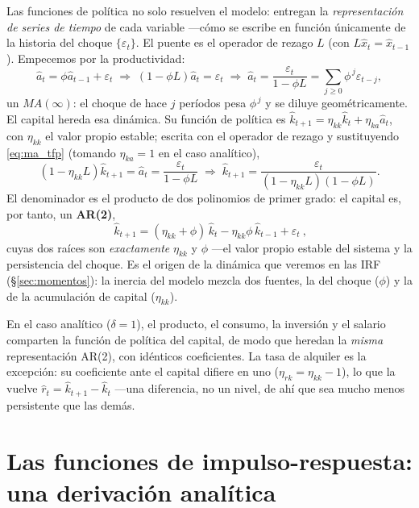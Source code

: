 \documentclass[11pt,a4paper]{report}
\begin{document}
Las funciones de política no solo resuelven el modelo: entregan la
\emph{representación de series de tiempo} de cada variable ---cómo se escribe en
función únicamente de la historia del choque $\{\varepsilon_t\}$. El puente es el
operador de rezago $L$ (con $L\hat{x}_t=\hat{x}_{t-1}$). Empecemos por la
productividad:
\begin{equation}
\hat{a}_t=\phi\hat{a}_{t-1}+\varepsilon_t
\;\Longrightarrow\;(1-\phi L)\hat{a}_t=\varepsilon_t
\;\Longrightarrow\;\hat{a}_t=\frac{\varepsilon_t}{1-\phi L}
=\sum_{j\ge0}\phi^{\,j}\varepsilon_{t-j}, \label{eq:ma_tfp}
\end{equation}
un $MA(\infty)$: el choque de hace $j$ períodos pesa $\phi^{\,j}$ y se diluye
geométricamente. El capital hereda esa dinámica. Su función de política es
$\hat{k}_{t+1}=\eta_{kk}\hat{k}_t+\eta_{ka}\hat{a}_t$, con $\eta_{kk}$ el valor propio
estable; escrita con el operador de rezago y sustituyendo \eqref{eq:ma_tfp} (tomando
$\eta_{ka}=1$ en el caso analítico),
\begin{equation}
(1-\eta_{kk}L)\hat{k}_{t+1}=\hat{a}_t=\frac{\varepsilon_t}{1-\phi L}
\;\Longrightarrow\;
\hat{k}_{t+1}=\frac{\varepsilon_t}{(1-\eta_{kk}L)(1-\phi L)}. \label{eq:kts}
\end{equation}
El denominador es el producto de dos polinomios de primer grado: el capital es, por
tanto, un \textbf{AR(2)},
\begin{equation}
\boxed{\ \hat{k}_{t+1}=(\eta_{kk}+\phi)\,\hat{k}_t-\eta_{kk}\phi\,\hat{k}_{t-1}
+\varepsilon_t\ }, \label{eq:kar2}
\end{equation}
cuyas dos raíces son \emph{exactamente} $\eta_{kk}$ y $\phi$ ---el valor propio estable
del sistema y la persistencia del choque. Es el origen de la dinámica que veremos en
las IRF (\S\ref{sec:momentos}): la inercia del modelo mezcla dos fuentes, la del
choque ($\phi$) y la de la acumulación de capital ($\eta_{kk}$).

En el caso analítico ($\delta=1$), el producto, el consumo, la inversión y el salario
comparten la función de política del capital, de modo que heredan la \emph{misma}
representación AR(2), con idénticos coeficientes. La tasa de alquiler es la excepción:
su coeficiente ante el capital difiere en uno ($\eta_{rk}=\eta_{kk}-1$), lo que la
vuelve $\hat{r}_t=\hat{k}_{t+1}-\hat{k}_t$ ---una diferencia, no un nivel, de ahí que
sea mucho menos persistente que las demás.

\section{Las funciones de impulso-respuesta: una derivación analítica}
\label{sec:irfanalitica}
\end{document}
